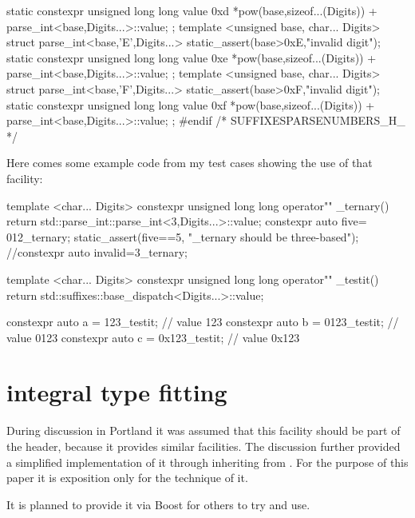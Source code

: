 \documentclass[ebook,11pt,article]{memoir}
\begin{document}
\begin{codeblock}
{{{    static constexpr unsigned long long value{ 0xd *pow(base,sizeof...(Digits))
                                               + parse_int<base,Digits...>::value};
};
template <unsigned base, char... Digits>
struct parse_int<base,'E',Digits...>{
    static_assert(base>0xE,"invalid digit");
    static constexpr unsigned long long value{ 0xe *pow(base,sizeof...(Digits))
                                               + parse_int<base,Digits...>::value};
};
template <unsigned base, char... Digits>
struct parse_int<base,'F',Digits...>{
    static_assert(base>0xF,"invalid digit");
    static constexpr unsigned long long value{ 0xf *pow(base,sizeof...(Digits))
                                               + parse_int<base,Digits...>::value};
};
}}
#endif /* SUFFIXESPARSENUMBERS_H_ */
\end{codeblock}

Here comes some example code from my test cases showing the use of that facility:
\begin{codeblock}
template <char... Digits>
constexpr  unsigned long long
operator"" _ternary(){
    return std::parse_int::parse_int<3,Digits...>::value;
}
constexpr auto five= 012_ternary;
static_assert(five==5, "_ternary should be three-based");
//constexpr auto invalid=3_ternary;

template <char... Digits>
constexpr  unsigned long long
operator"" _testit(){
    return std::suffixes::base_dispatch<Digits...>::value;
}

constexpr auto a = 123_testit;   // value 123
constexpr auto b = 0123_testit;  // value 0123
constexpr auto c = 0x123_testit; // value 0x123

\end{codeblock}


\section{integral type fitting}
During discussion in Portland it was assumed that this facility should be part of the  header, because it provides similar facilities. The discussion further provided a simplified implementation of it through inheriting from . For the purpose of this paper it is exposition only for the technique of it.

It is planned to provide it via Boost for others to try and use.
\end{document}
